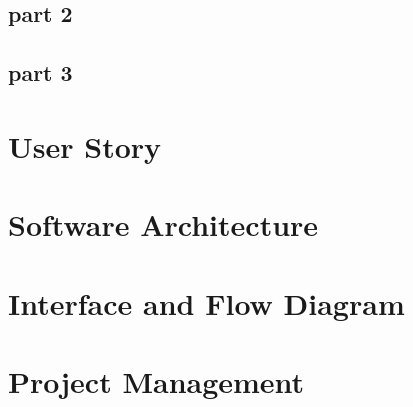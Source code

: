 \documentclass[12pt]{article}
\begin{document}
\subsection{part 2}
\subsection{part 3}

\section{User Story}
\section{Software Architecture}
\section{Interface and Flow Diagram}
\section{Project Management}
\end{document}
